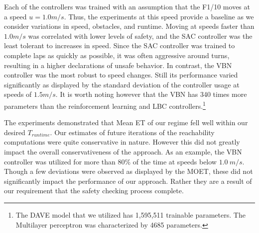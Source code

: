 \documentclass[manuscript,screen,review]{acmart}
\newcommand{\nate}[1]{\textcolor{magenta}{\textbf{\underline{Nate:}} #1}}
\begin{document}
Each of the controllers was trained with an assumption that the F1/10 moves at a speed $u=1.0 m/s$. Thus, the experiments at this speed provide a baseline as we consider variations in speed, obstacles, and runtime. Moving at speeds faster than $1.0 m/s$ was correlated with lower levels of safety, and the SAC controller was the least tolerant to increases in speed. Since the SAC controller was trained to complete laps as quickly as possible, it was often aggressive around turns, resulting in a higher declarations of unsafe behavior. In contrast, the VBN controller was the most robust to speed changes. Still its performance varied significantly as displayed by the standard deviation of the controller usage at speeds of $1.5 m/s$. It is worth noting however that the VBN has 340 times more parameters than the reinforcement learning and LBC controllers.\footnote{The DAVE model that we utilized has 1,595,511 trainable parameters. The Multilayer perceptron was characterized by 4685 parameters.}



The experiments demonstrated that Mean ET of our regime fell well within our desired $T_{runtime}$. Our estimates of future iterations of the reachability computations were quite conservative in nature. However this did not greatly impact the overall conservativeness of the approach. As an example, the VBN controller was utilized for more than 80\% of the time at speeds below $1.0 \ m/s$. Though a few deviations were observed as displayed by the MOET, these did not significantly impact the performance of our approach. Rather they are a result of our requirement that the safety checking process complete.


\end{document}
